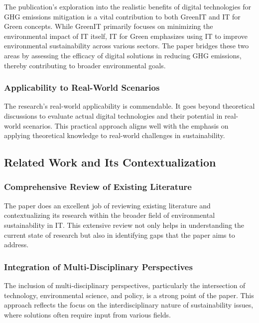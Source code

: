 \documentclass[conference,compsoc]{IEEEtran}
\begin{document}
The publication's exploration into the realistic benefits of digital technologies for GHG emissions mitigation is a vital contribution to both GreenIT and IT for Green concepts. While GreenIT primarily focuses on minimizing the environmental impact of IT itself, IT for Green emphasizes using IT to improve environmental sustainability across various sectors. The paper bridges these two areas by assessing the efficacy of digital solutions in reducing GHG emissions, thereby contributing to broader environmental goals.

\subsubsection{Applicability to Real-World Scenarios}

The research's real-world applicability is commendable. It goes beyond theoretical discussions to evaluate actual digital technologies and their potential in real-world scenarios. This practical approach aligns well with the  emphasis on applying theoretical knowledge to real-world challenges in sustainability.

\subsection{Related Work and Its Contextualization}

\subsubsection{Comprehensive Review of Existing Literature}

The paper does an excellent job of reviewing existing literature and contextualizing its research within the broader field of environmental sustainability in IT. This extensive review not only helps in understanding the current state of research but also in identifying gaps that the paper aims to address.

\subsubsection{Integration of Multi-Disciplinary Perspectives}

The inclusion of multi-disciplinary perspectives, particularly the intersection of technology, environmental science, and policy, is a strong point of the paper. This approach reflects the  focus on the interdisciplinary nature of sustainability issues, where solutions often require input from various fields.
\end{document}
